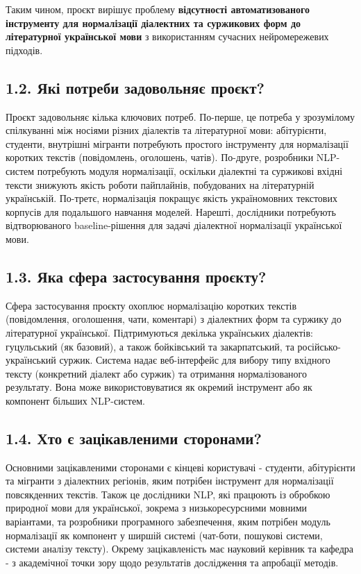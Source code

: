 \documentclass[14pt]{extarticle}
\begin{document}
Таким чином, проєкт вирішує проблему \textbf{відсутності автоматизованого інструменту для нормалізації діалектних та суржикових форм до літературної української мови} з використанням сучасних нейромережевих підходів.

\subsection*{1.2. Які потреби задовольняє проєкт?}

Проєкт задовольняє кілька ключових потреб. По-перше, це потреба у зрозумілому спілкуванні між носіями різних діалектів та літературної мови: абітурієнти, студенти, внутрішні мігранти потребують простого інструменту для нормалізації коротких текстів (повідомлень, оголошень, чатів). По-друге, розробники NLP-систем потребують модуля нормалізації, оскільки діалектні та суржикові вхідні тексти знижують якість роботи пайплайнів, побудованих на літературній українській. По-третє, нормалізація покращує якість україномовних текстових корпусів для подальшого навчання моделей. Нарешті, дослідники потребують відтворюваного baseline-рішення для задачі діалектної нормалізації української мови.

\subsection*{1.3. Яка сфера застосування проєкту?}

Сфера застосування проєкту охоплює нормалізацію коротких текстів (повідомлення, оголошення, чати, коментарі) з діалектних форм та суржику до літературної української. Підтримуються декілька українських діалектів: гуцульський (як базовий), а також бойківський та закарпатський, та російсько-український суржик. Система надає веб-інтерфейс для вибору типу вхідного тексту (конкретний діалект або суржик) та отримання нормалізованого результату. Вона може використовуватися як окремий інструмент або як компонент більших NLP-систем.

\subsection*{1.4. Хто є зацікавленими сторонами?}

Основними зацікавленими сторонами є кінцеві користувачі - студенти, абітурієнти та мігранти з діалектних регіонів, яким потрібен інструмент для нормалізації повсякденних текстів. Також це дослідники NLP, які працюють із обробкою природної мови для української, зокрема з низькоресурсними мовними варіантами, та розробники програмного забезпечення, яким потрібен модуль нормалізації як компонент у ширшій системі (чат-боти, пошукові системи, системи аналізу тексту). Окрему зацікавленість має науковий керівник та кафедра - з академічної точки зору щодо результатів дослідження та апробації методів.
\end{document}
